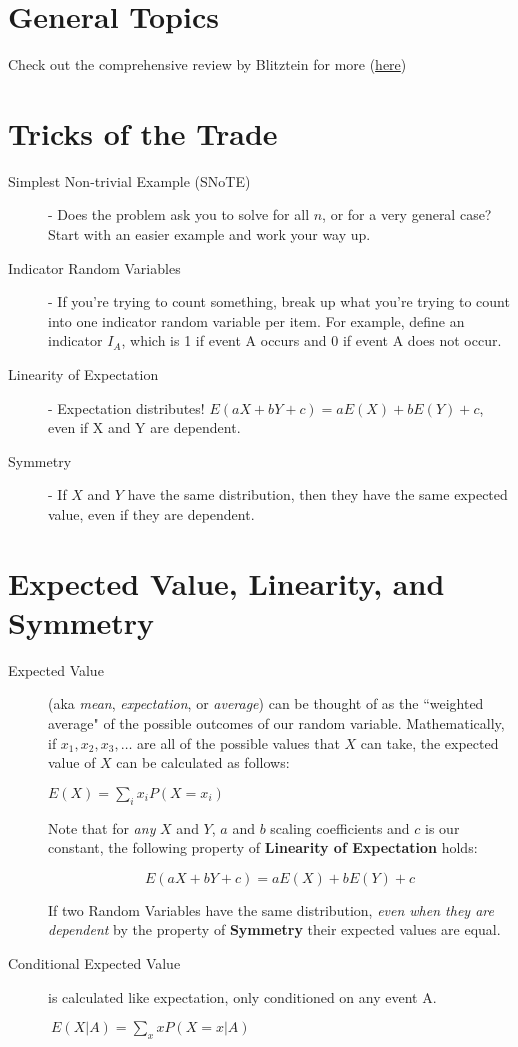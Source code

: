 \documentclass[11pt]{article}
\begin{document}

\section*{General Topics}
Check out the comprehensive review by Blitztein for more (\href{https://canvas.harvard.edu/courses/6017/files/folder/Handouts?preview=1509908}{here})

\section*{Tricks of the Trade}
\begin{description}
\item[Simplest Non-trivial Example (SNoTE)] - Does the problem ask you to solve for all $n$, or for a very general case? Start with an easier example and work your way up.
\item[Indicator Random Variables] - If you're trying to count something, break up what you're trying to count into one indicator random variable per item. For example, define an indicator $I_A$, which is 1 if event A occurs and 0 if event A does not occur.
\item[Linearity of Expectation] - Expectation distributes! $E(aX + bY + c) = aE(X) + bE(Y) + c$, even if X and Y are dependent.
\item[Symmetry] - If $X$ and $Y$ have the same distribution, then they have the same expected value, even if they are dependent.
\end{description}
\section*{Expected Value, Linearity, and Symmetry}
\begin{description}
\item[Expected Value] (aka \emph{mean}, \emph{expectation}, or \emph{average}) can be thought of as the ``weighted average" of the possible outcomes of our random variable. Mathematically, if $x_1, x_2, x_3, \dots$ are all of the possible values that $X$ can take, the expected value of $X$ can be calculated as follows:
\begin{center}
$E(X) = \sum\limits_{i}x_iP(X=x_i)$
\end{center}
Note that for \emph{any} $X$ and $Y$, $a$ and $b$ scaling coefficients and $c$ is our constant, the following property of \textbf{Linearity of Expectation} holds:

\[E(aX + bY + c) = aE(X) + bE(Y) + c \]

If two Random Variables have the same distribution, \emph{even when they are dependent} by the property of \textbf{Symmetry} their expected values are equal.



\item[Conditional Expected Value] is calculated like expectation, only conditioned on any event A. \begin{center}
$\ E(X | A) = \sum\limits_{x}xP(X=x | A)$
\end{center}

\end{description}
\end{document}
